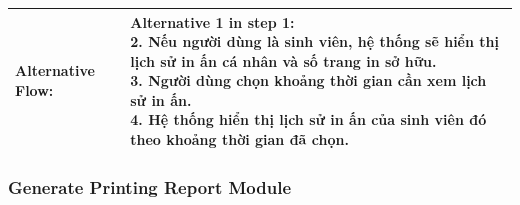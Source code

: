\begin{table}[h!]
\begin{tabular}{ |p{4cm}|p{3cm}|p{3cm}|p{3cm}|  }
		\hline
		Alternative Flow: & \multicolumn{3}{p{10cm}|}{
			Alternative 1 in step 1:\newline
			2. Nếu người dùng là sinh viên, hệ thống sẽ hiển thị lịch sử in ấn cá nhân và số trang in sở hữu.\newline
			3. Người dùng chọn khoảng thời gian cần xem lịch sử in ấn.\newline
			4. Hệ thống hiển thị lịch sử in ấn của sinh viên đó theo khoảng thời gian đã chọn.
		}                                                                                                                         \\
		\hline
	\end{tabular}
\end{table}
\newpage

\subsubsection{Generate Printing Report Module}
